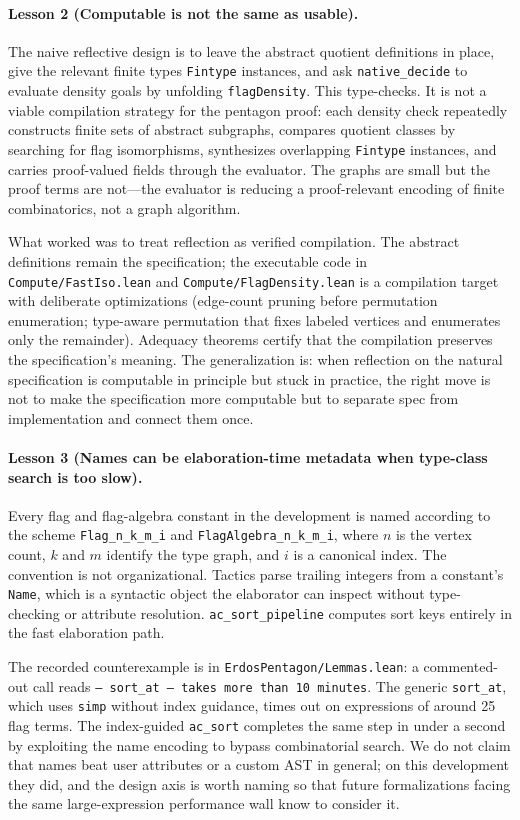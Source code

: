 \documentclass{article}
\newcommand{\lean}[1]{\texttt{#1}}
\begin{document}
\paragraph{Lesson 2 (Computable is not the same as usable).}
The naive reflective design is to leave the abstract quotient definitions in
place, give the relevant finite types \lean{Fintype} instances, and ask
\lean{native\_decide} to evaluate density goals by unfolding
\lean{flagDensity}.  This type-checks.  It is not a viable compilation
strategy for the pentagon proof: each density check repeatedly constructs
finite sets of abstract subgraphs, compares quotient classes by searching
for flag isomorphisms, synthesizes overlapping \lean{Fintype} instances, and
carries proof-valued fields through the evaluator.  The graphs are small but
the proof terms are not---the evaluator is reducing a proof-relevant
encoding of finite combinatorics, not a graph algorithm.

What worked was to treat reflection as verified compilation.  The abstract
definitions remain the specification; the executable code in
\texttt{Compute/FastIso.lean} and \texttt{Compute/FlagDensity.lean} is a
compilation target with deliberate optimizations (edge-count pruning before
permutation enumeration; type-aware permutation that fixes labeled vertices
and enumerates only the remainder).  Adequacy theorems certify that the
compilation preserves the specification's meaning.  The generalization is:
when reflection on the natural specification is computable in principle but
stuck in practice, the right move is not to make the specification more
computable but to separate spec from implementation and connect them once.

\paragraph{Lesson 3 (Names can be elaboration-time metadata when type-class
search is too slow).}
Every flag and flag-algebra constant in the development is named according
to the scheme \lean{Flag\_n\_k\_m\_i} and \lean{FlagAlgebra\_n\_k\_m\_i},
where $n$ is the vertex count, $k$ and $m$ identify the type graph, and $i$
is a canonical index.  The convention is not organizational.  Tactics parse
trailing integers from a constant's \lean{Name}, which is a syntactic object
the elaborator can inspect without type-checking or attribute resolution.
\lean{ac\_sort\_pipeline} computes sort keys entirely in the fast
elaboration path.

The recorded counterexample is in \texttt{ErdosPentagon/Lemmas.lean}: a
commented-out call reads \texttt{-- sort\_at -- takes more than 10 minutes}.
The generic \lean{sort\_at}, which uses \lean{simp} without index guidance,
times out on expressions of around 25 flag terms.  The index-guided
\lean{ac\_sort} completes the same step in under a second by exploiting the
name encoding to bypass combinatorial search.  We do not claim that names
beat user attributes or a custom AST in general; on this development they
did, and the design axis is worth naming so that future formalizations
facing the same large-expression performance wall know to consider it.
\end{document}
